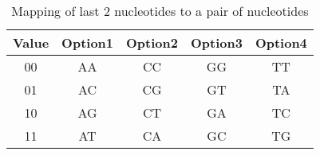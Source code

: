 \documentclass[twoside]{ASDJ}
\begin{document}
\begin{table}
\begin{tabular}{ccccc}
  Value & Option1 & Option2 & Option3 & Option4 \\
  \hline
  \hline
  00 & AA & CC & GG & TT \\
  01 & AC & CG & GT & TA \\
  10 & AG & CT & GA & TC \\
  11 & AT & CA & GC & TG \\
  \hline
\end{tabular}
\caption{Mapping of last 2 nucleotides to a pair of nucleotides}
\end{table}
\end{document}
